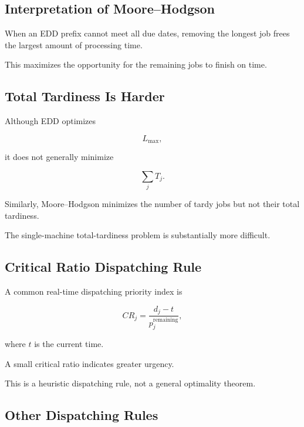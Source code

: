 \subsection{Interpretation of Moore--Hodgson}
\label{subsec:moore-hodgson-interpretation}

When an EDD prefix cannot meet all due dates, removing the longest job
frees the largest amount of processing time.

This maximizes the opportunity for the remaining jobs to finish on time.

\subsection{Total Tardiness Is Harder}
\label{subsec:total-tardiness-hardness}

Although EDD optimizes

\[
L_{\max},
\]

it does not generally minimize

\[
\sum_jT_j.
\]

Similarly, Moore--Hodgson minimizes the number of tardy jobs but not their
total tardiness.

The single-machine total-tardiness problem is substantially more
difficult.

\subsection{Critical Ratio Dispatching Rule}
\label{subsec:critical-ratio-rule}

A common real-time dispatching priority index is

\[
\boxed{
CR_j
=
\frac{
d_j-t
}{
p_j^{\mathrm{remaining}}
},
}
\]

where \(t\) is the current time.

A small critical ratio indicates greater urgency.

This is a heuristic dispatching rule, not a general optimality theorem.

\subsection{Other Dispatching Rules}
\label{subsec:other-dispatching-rules}

